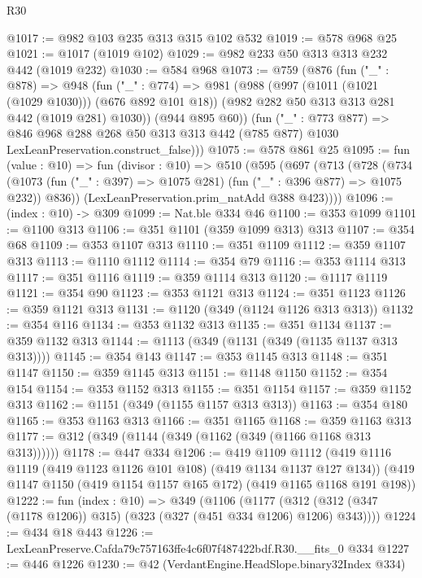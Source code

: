 \begin{lexlean}{R30}
\begin{coremodule}
@1017 := @982 @103 @235 @313 @315 @102 @532
@1019 := @578 @968 @25
@1021 := @1017 (@1019 @102)
@1029 := @982 @233 @50 @313 @313 @232 @442 (@1019 @232)
@1030 := @584 @968
@1073 := @759
    (@876
      (fun ("_" : @878) =>
      @948
        (fun ("_" : @774) =>
        @981
          (@988
            (@997 (@1011 (@1021 (@1029 @1030))) (@676 @892 @101 @18))
            (@982 @282 @50 @313 @313 @281 @442 (@1019 @281) @1030))
          (@944 @895 @60))
        (fun ("_" : @773 @877) =>
        @846
          @968
          @288
          @268
          @50
          @313
          @313
          @442
          (@785 @877)
          @1030
          LexLeanPreservation.construct_false)))
@1075 := @578 @861 @25
@1095 := fun (value : @10) =>
  fun (divisor : @10) =>
  @510
    (@595
      (@697
        (@713
          (@728
            (@734
              (@1073 (fun ("_" : @397) => @1075 @281) (fun ("_" : @396 @877) => @1075 @232))
              @836))
          (LexLeanPreservation.prim_natAdd @388 @423))))
@1096 := (index : @10) -> @309
@1099 := Nat.ble @334 @46
@1100 := @353 @1099
@1101 := @1100 @313
@1106 := @351 @1101 (@359 @1099 @313) @313
@1107 := @354 @68
@1109 := @353 @1107 @313
@1110 := @351 @1109
@1112 := @359 @1107 @313
@1113 := @1110 @1112
@1114 := @354 @79
@1116 := @353 @1114 @313
@1117 := @351 @1116
@1119 := @359 @1114 @313
@1120 := @1117 @1119
@1121 := @354 @90
@1123 := @353 @1121 @313
@1124 := @351 @1123
@1126 := @359 @1121 @313
@1131 := @1120 (@349 (@1124 @1126 @313 @313))
@1132 := @354 @116
@1134 := @353 @1132 @313
@1135 := @351 @1134
@1137 := @359 @1132 @313
@1144 := @1113 (@349 (@1131 (@349 (@1135 @1137 @313 @313))))
@1145 := @354 @143
@1147 := @353 @1145 @313
@1148 := @351 @1147
@1150 := @359 @1145 @313
@1151 := @1148 @1150
@1152 := @354 @154
@1154 := @353 @1152 @313
@1155 := @351 @1154
@1157 := @359 @1152 @313
@1162 := @1151 (@349 (@1155 @1157 @313 @313))
@1163 := @354 @180
@1165 := @353 @1163 @313
@1166 := @351 @1165
@1168 := @359 @1163 @313
@1177 := @312 (@349 (@1144 (@349 (@1162 (@349 (@1166 @1168 @313 @313))))))
@1178 := @447 @334
@1206 := @419
    @1109
    @1112
    (@419 @1116 @1119 (@419 @1123 @1126 @101 @108) (@419 @1134 @1137 @127 @134))
    (@419 @1147 @1150 (@419 @1154 @1157 @165 @172) (@419 @1165 @1168 @191 @198))
@1222 := fun (index : @10) =>
  @349
    (@1106
      (@1177 (@312 (@312 (@347 (@1178 @1206)) @315) (@323 (@327 (@451 @334 @1206) @1206) @343))))
@1224 := @434 @18 @443
@1226 := LexLeanPreserve.Cafda79c757163ffe4c6f07f487422bdf.R30.__fits_0 @334
@1227 := @446 @1226
@1230 := @42 (VerdantEngine.HeadSlope.binary32Index @334)

\end{coremodule}
\end{lexlean}
